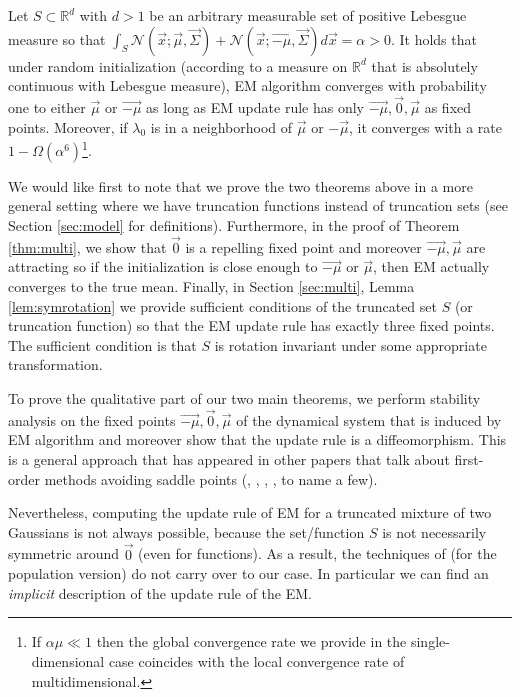 \begin{theorem}\label{thm:multi} Let $S \subset \mathbb{R}^d$ with $d>1$ be an arbitrary measurable set of positive Lebesgue measure so that $\int_S \mathcal{N}(\vec{x};\vec{\mu}, \vec{\Sigma}) + \mathcal{N}(\vec{x};\vec{-\mu}, \vec{\Sigma}) d\vec{x} = \alpha>0$. It holds that under random initialization (according to a measure on $\mathbb{R}^d$ that is absolutely continuous with Lebesgue measure), EM algorithm converges with probability one to either $\vec{\mu}$ or $\vec{-\mu}$ as long as EM update rule has only $\vec{-\mu},\vec{0},\vec{\mu}$ as fixed points. Moreover, if $\lambda_0$ is in a neighborhood of $\vec{\mu}$ or $-\vec{\mu}$, it converges with a rate $1 - \Omega(\alpha^6)$\footnote{If $ \alpha \mu \ll 1$ then the global convergence rate we provide in the single-dimensional case coincides with the local convergence rate of multidimensional.}.
\end{theorem}

\begin{remark} We would like first to note that we prove the two theorems above in a more general setting where we have truncation functions instead of truncation sets (see Section \ref{sec:model} for definitions). Furthermore, in the proof of Theorem \ref{thm:multi}, we show that $\vec{0}$ is a repelling fixed point and moreover $\vec{-\mu},\vec{\mu}$ are attracting so if the initialization is close enough to $\vec{-\mu}$ or $\vec{\mu}$, then EM actually converges to the true mean. Finally, in Section \ref{sec:multi}, Lemma \ref{lem:symrotation} we provide sufficient conditions of the truncated set $S$ (or truncation function) so that the EM update rule has exactly three fixed points. The sufficient condition is that $S$ is rotation invariant under some appropriate transformation.
\end{remark}

To prove the qualitative part of our two main theorems, we perform stability analysis on the fixed points $\vec{-\mu},\vec{0},\vec{\mu}$ of the dynamical system that is induced by EM algorithm and moreover show that the update rule is a diffeomorphism. This is a general approach that has appeared in other papers that talk about first-order methods avoiding saddle points (\cite{MPP15}, \cite{LSJR16}, \cite{PP17}, \cite{LPPSJR17}, \cite{DP18} to name a few).

Nevertheless, computing the update rule of EM for a truncated mixture of two Gaussians is not always possible, because the set/function $S$ is not necessarily symmetric around $\vec{0}$ (even for functions). As a result, the techniques of \cite{DTZ17} (for the population version) do not carry over to our case. In particular we can find an \textit{implicit} description of the update rule of the EM.

